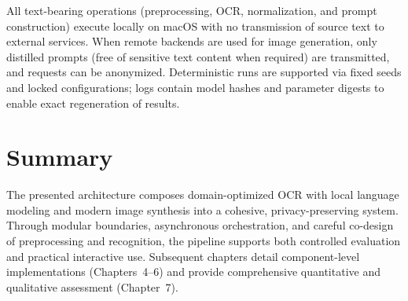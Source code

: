 All text-bearing operations (preprocessing, OCR, normalization, and prompt construction) execute locally on macOS with no transmission of source text to external services. When remote backends are used for image generation, only distilled prompts (free of sensitive text content when required) are transmitted, and requests can be anonymized. Deterministic runs are supported via fixed seeds and locked configurations; logs contain model hashes and parameter digests to enable exact regeneration of results.

\section{Summary}

The presented architecture composes domain-optimized OCR with local language modeling and modern image synthesis into a cohesive, privacy-preserving system. Through modular boundaries, asynchronous orchestration, and careful co-design of preprocessing and recognition, the pipeline supports both controlled evaluation and practical interactive use. Subsequent chapters detail component-level implementations (Chapters~4--6) and provide comprehensive quantitative and qualitative assessment (Chapter~7).
